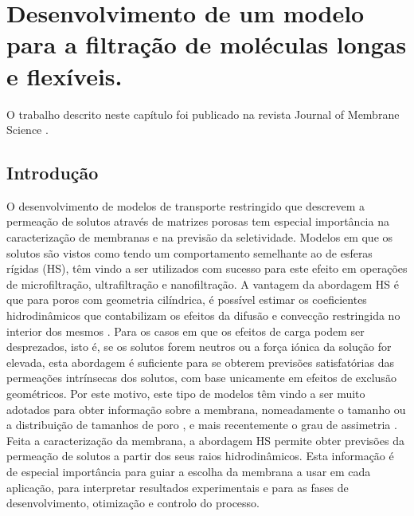 \chapter{Desenvolvimento de um modelo para a filtração de moléculas longas e flexíveis.}
\label{chap:art1}%

O trabalho descrito neste capítulo foi publicado na revista Journal of Membrane Science \cite{meu1}.

\section{Introdução}
%
%
O desenvolvimento de modelos de transporte restringido que descrevem a permeação de solutos através de matrizes porosas tem especial importância na caracterização de membranas e na previsão da seletividade. Modelos em que os solutos são vistos como tendo um comportamento semelhante ao de esferas rígidas (HS), têm vindo a ser utilizados com sucesso para este efeito em operações de microfiltração, ultrafiltração e nanofiltração. A vantagem da abordagem HS é que para poros com geometria cilíndrica, é possível estimar os coeficientes hidrodinâmicos que contabilizam os efeitos da difusão e convecção restringida no interior dos mesmos \cite{deen,bowen02,dechadilok}. Para os casos em que os efeitos de carga podem ser desprezados, isto é, se os solutos forem neutros ou a força iónica da solução for elevada, esta abordagem é suficiente para se obterem previsões satisfatórias das permeações intrínsecas dos solutos, com base unicamente em efeitos de exclusão geométricos. Por este motivo, este tipo de modelos têm vindo a ser muito adotados para obter informação sobre a membrana, nomeadamente o tamanho ou a distribuição de tamanhos de poro \cite{bowen02,xenopoulos,bruggen,noordman}, e mais recentemente o grau de assimetria \cite{moraompa}. Feita a caracterização da membrana, a abordagem HS permite obter previsões da permeação de solutos a partir dos seus raios hidrodinâmicos. Esta informação é de especial importância para guiar a escolha da membrana a usar em cada aplicação, para interpretar resultados experimentais e para as fases de desenvolvimento, otimização e controlo do processo.

